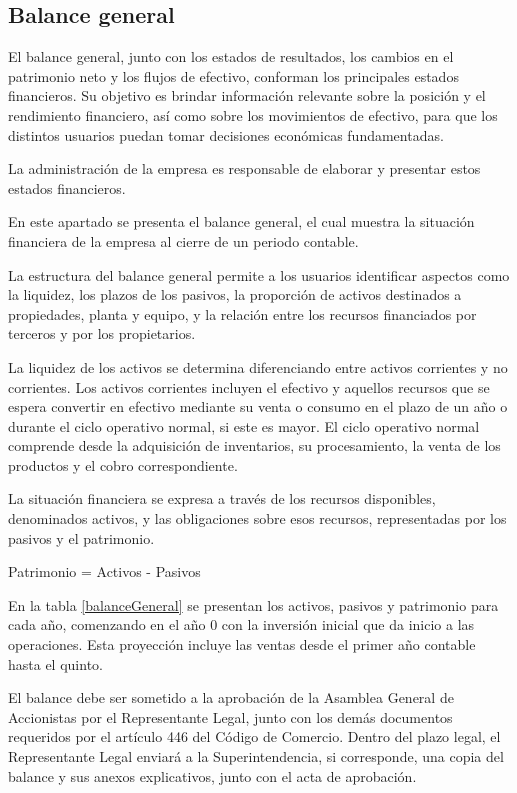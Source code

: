 \subsection{Balance general}

El balance general, junto con los estados de resultados, los cambios en el patrimonio neto y los flujos de efectivo, conforman los principales estados financieros. Su objetivo es brindar información relevante sobre la posición y el rendimiento financiero, así como sobre los movimientos de efectivo, para que los distintos usuarios puedan tomar decisiones económicas fundamentadas.

La administración de la empresa es responsable de elaborar y presentar estos estados financieros.

En este apartado se presenta el balance general, el cual muestra la situación financiera de la empresa al cierre de un periodo contable.

La estructura del balance general permite a los usuarios identificar aspectos como la liquidez, los plazos de los pasivos, la proporción de activos destinados a propiedades, planta y equipo, y la relación entre los recursos financiados por terceros y por los propietarios.

La liquidez de los activos se determina diferenciando entre activos corrientes y no corrientes. Los activos corrientes incluyen el efectivo y aquellos recursos que se espera convertir en efectivo mediante su venta o consumo en el plazo de un año o durante el ciclo operativo normal, si este es mayor. El ciclo operativo normal comprende desde la adquisición de inventarios, su procesamiento, la venta de los productos y el cobro correspondiente.

La situación financiera se expresa a través de los recursos disponibles, denominados activos, y las obligaciones sobre esos recursos, representadas por los pasivos y el patrimonio.

\begin{center}
    Patrimonio = Activos - Pasivos
\end{center}

En la tabla \ref{balanceGeneral} se presentan los activos, pasivos y patrimonio para cada año, comenzando en el año 0 con la inversión inicial que da inicio a las operaciones. Esta proyección incluye las ventas desde el primer año contable hasta el quinto.

El balance debe ser sometido a la aprobación de la Asamblea General de Accionistas por el Representante Legal, junto con los demás documentos requeridos por el artículo 446 del Código de Comercio. Dentro del plazo legal, el Representante Legal enviará a la Superintendencia, si corresponde, una copia del balance y sus anexos explicativos, junto con el acta de aprobación.

